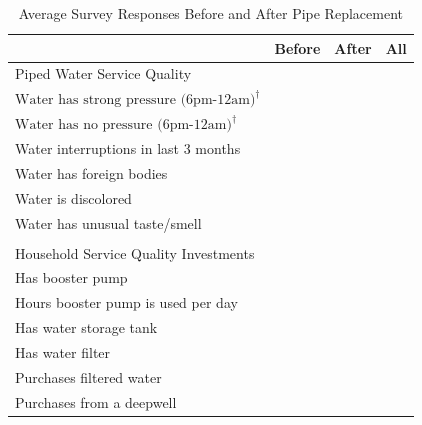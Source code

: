 \documentclass[12pt,table]{article}
\begin{document}
\begin{table}[h!] 
\centering
\caption{Average Survey Responses Before and After Pipe Replacement}\label{table:descriptives}
\vspace{-2mm}
\begin{threeparttable}
\begin{tabular}{@{}l*{1}{KKK}@{}}
\toprule
  & Before & After  & All \\
\midrule
Piped Water Service Quality \\[.5em]
\hspace{1em}$\text{Water has strong pressure (6pm-12am)}^{\dagger}$ &  \\
\hspace{1em}$\text{Water has no pressure (6pm-12am)}^{\dagger}$  &  \\
\hspace{1em}Water interruptions in last 3 months &  \\
\hspace{1em}Water has foreign bodies &  \\
\hspace{1em}Water is discolored &  \\
\hspace{1em}Water has unusual taste/smell &  \\
\\[-.5em]
Household Service Quality Investments \\[.5em]
\hspace{1em}Has booster pump &  \\
\hspace{1em}Hours booster pump is used per day &  \\
\hspace{1em}Has water storage tank &  \\
\hspace{1em}Has water filter &  \\
\hspace{1em}Purchases filtered water &  \\
\hspace{1em}Purchases from a deepwell &  \\

\end{tabular}
\end{threeparttable}
\end{table}
\end{document}
